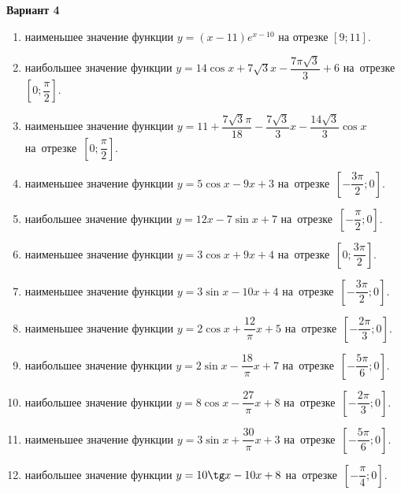 \documentclass[a4paper,10pt]{article}
\begin{document}
\begin{center}\Large\textbf{Вариант 4}\end{center}

\begin{enumerate}
\item {} наименьшее значение функции $y=\left(x-11\right)e^{x-10}$ на отрезке $\left[9;11\right]$.

\item {} наибольшее значение функции $y=14\cos x+7\sqrt{3} x-\dfrac{7 \pi\sqrt{3} }{3}+6$ на~отрезке~$\left[0;\dfrac{\pi }{2}\right]$.

\item {} наименьшее значение функции $y=11+\dfrac{7\sqrt{3}\pi }{18}-\dfrac{7\sqrt{3}}{3}x-\dfrac{14\sqrt{3}}{3}\cos x$ на~отрезке~$\left[0;\dfrac{\pi }{2}\right]$.

\item {} наименьшее значение функции $y=5\cos x-9x+3$ на~отрезке~$\left[-\dfrac{3\pi }{2};0\right]$.

\item {} наибольшее значение функции $y=12x-7\sin x+7$ на~отрезке~$\left[-\dfrac{\pi }{2};0\right]$.

\item {} наименьшее значение функции $y=3\cos x+9x+4$ на~отрезке~$\left[0;\dfrac{3\pi }{2}\right]$.

\item {} наименьшее значение функции $y=3\sin x-10x+4$ на~отрезке~$\left[-\dfrac{3\pi }{2};0\right]$.

\item {} наименьшее значение функции $y=2\cos x+\dfrac{12}{\pi }x+5$ на~отрезке~$\left[-\dfrac{2\pi }{3};0\right]$.

\item {} наибольшее значение функции $y=2\sin x-\dfrac{18}{\pi }x+7$ на~отрезке~$\left[-\dfrac{5\pi }{6};0\right]$.

\item {} наибольшее значение функции $y=8\cos x-\dfrac{27}{\pi }x+8$ на~отрезке~$\left[-\dfrac{2\pi }{3};0\right]$.

\item {} наименьшее значение функции $y=3\sin x+\dfrac{30}{\pi }x+3$ на~отрезке~$\left[-\dfrac{5\pi }{6};0\right]$.

\item {} наибольшее значение функции $y=10\tg x-10x+8$ на~отрезке~$\left[-\dfrac{\pi }{4};0\right]$.


\end{enumerate}
\end{document}
